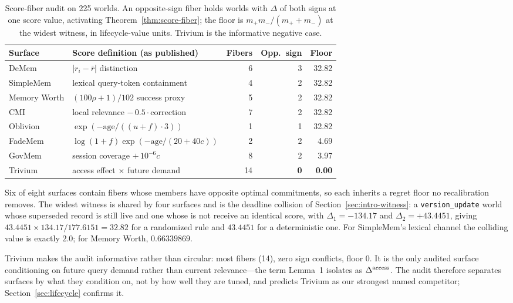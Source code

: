 \documentclass{article}
\begin{document}
\begin{table}[t]
\caption{Score-fiber audit on 225 worlds. An opposite-sign fiber holds worlds
with $\Delta$ of both signs at one score value, activating
Theorem~\ref{thm:score-fiber}; the floor is $m_+m_-/(m_++m_-)$ at the widest
witness, in lifecycle-value units. Trivium is the informative negative case.}
\label{tab:fiber}
\centering\small
\begin{tabular}{llrrr}
\toprule
Surface & Score definition (as published) & Fibers & Opp.\ sign & Floor \\
\midrule
DeMem            & $|r_i-\bar r|$ distinction               & 6  & 3 & 32.82 \\
SimpleMem        & lexical query-token containment          & 4  & 2 & 32.82 \\
Memory Worth     & $(100\rho+1)/102$ success proxy          & 5  & 2 & 32.82 \\
CMI              & local relevance $-\,0.5\cdot$correction  & 7  & 2 & 32.82 \\
Oblivion         & $\exp(-\text{age}/((u+f)\cdot 3))$       & 1  & 1 & 32.82 \\
FadeMem          & $\log(1{+}f)\exp(-\text{age}/(20{+}40c))$& 2  & 2 & \phantom{0}4.69 \\
GovMem           & session coverage $+\,10^{-6}c$           & 8  & 2 & \phantom{0}3.97 \\
\midrule
Trivium          & access effect $\times$ future demand     & 14 & \textbf{0} & \textbf{0.00} \\
\bottomrule
\end{tabular}
\end{table}

Six of eight surfaces contain fibers whose members have opposite optimal commitments,
so each inherits a regret floor no recalibration removes. The widest witness is shared
by four surfaces and is the deadline collision of Section~\ref{sec:intro-witness}: a
\texttt{version\_update} world whose superseded record is still live and one whose is
not receive an identical score, with $\Delta_1=-134.17$ and $\Delta_2=+43.4451$,
giving $43.4451\times134.17/177.6151=32.82$ for a randomized rule and $43.4451$ for a
deterministic one. For SimpleMem's lexical channel the colliding value is exactly
$2.0$; for Memory Worth, $0.66339869$.

Trivium makes the audit informative rather than circular: most fibers (14), zero sign
conflicts, floor $0$. It is the only audited surface conditioning on future query
demand rather than current relevance---the term Lemma~1 isolates as
$\Delta^{\rm access}$. The audit therefore separates surfaces by what they condition
on, not by how well they are tuned, and predicts Trivium as our strongest named
competitor; Section~\ref{sec:lifecycle} confirms it.
\end{document}
